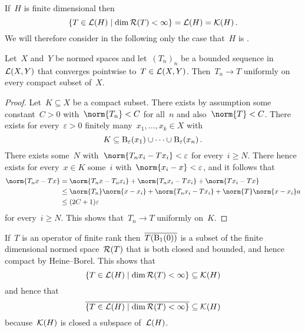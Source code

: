 \subsection{}

If~$H$ is finite dimensional then
\[
  \{
    T \in \Lin(H)
  \suchthat
    \dim \Range(T) < \infty
  \}
  =
  \Lin(H)
  =
  \Compact(H) \,.
\]
We will therefore consider in the following only the case that~$H$ is .


\begin{lemma}
  \label{uniform on compact}
  Let~$X$ and~$Y$ be normed spaces and let~$(T_n)_n$ be a bounded sequence in~$\mathcal{L}(X,Y)$ that converges pointwise to~$T \in \mathcal{L}(X,Y)$.
  Then~$T_n \to T$ uniformly on every compact subset of~$X$.
\end{lemma}


\begin{proof}
  Let~$K \subseteq X$ be a compact subset.
  There exists by assumption some constant~$C > 0$ with~$\norm{T_n} < C$ for all~$n$ and also~$\norm{T} < C$.
  There exists for every~$\varepsilon > 0$ finitely many~$x_1, \dotsc, x_k \in X$ with
  \[
    K
    \subseteq
    \operatorname{B}_{\varepsilon}(x_1) \cup \dotsb \cup \operatorname{B}_{\varepsilon}(x_n) \,.
  \]
  There exists some~$N$ with~$\norm{T_n x_i - T x_i} < \varepsilon$ for every~$i \geq N$.
  There hence exists for every~$x \in K$ some~$i$ with~$\norm{x_i - x} < \varepsilon$, and it follows that
  \begin{align*}
    \norm{T_n x - T x}
    &=
      \norm{ T_n x - T_n x_i }
    + \norm{ T_n x_i - T x_i }
    + \norm{ T x_i - T x }
    \\
    &\leq
      \norm{T_n} \norm{x - x_i}
    + \norm{ T_n x_i - T x_i }
    + \norm{T} \norm{x - x_i}a
    \\
    &\leq
    (2 C + 1) \varepsilon
  \end{align*}
  for every~$i \geq N$.
  This shows that~$T_n \to T$ uniformly on~$K$.
\end{proof}

If~$T$ is an operator of finite rank then~$\overline{T(\operatorname{B}_{1}(0))}$ is a subset of the finite dimensional normed space~$\mathcal{R}(T)$ that is both closed and bounded, and hence compact by Heine--Borel.
This shows that
\[
  \{
    T \in \Lin(H)
  \suchthat
    \dim \Range(T) < \infty
  \}
  \subseteq
  \Compact(H)
\]
and hence that
\[
  \closure{
  \{
    T \in \Lin(H)
  \suchthat
    \dim \Range(T) < \infty
  \}
  }
  \subseteq
  \Compact(H)
\]
because~$\mathcal{K}(H)$ is closed a subspace of~$\mathcal{L}(H)$.

